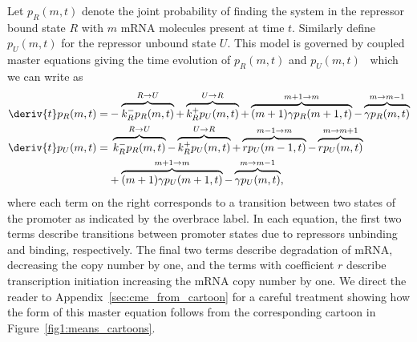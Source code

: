 Let $p_R(m,t)$ denote the joint probability of finding the system in the
repressor bound state $R$ with $m$ mRNA molecules present at time $t$. Similarly
define $p_U(m,t)$ for the repressor unbound state $U$. This model is governed
by coupled master equations giving the time evolution of $p_R(m,t)$ and
$p_U(m,t)$~\cite{Sanchez2008, Sanchez2011, Phillips2019} which we can write as
\begin{align}
\begin{split}
\deriv{t}p_R(m,t) =& 
- \overbrace{k_R^- p_R(m,t)}^{R \rightarrow U}
+ \overbrace{k_R^+ p_U(m,t)}^{U \rightarrow R}
+ \overbrace{(m+1)\gamma p_R(m+1,t)}^{m + 1 \rightarrow m}
- \overbrace{\gamma p_R(m,t)}^{m \rightarrow m - 1}
\\
\deriv{t}p_U(m,t) =&\; 
\overbrace{k_R^- p_R(m,t)}^{R \rightarrow U}
- \overbrace{k_R^+ p_U(m,t)}^{U \rightarrow R}
+ \overbrace{rp_U(m-1,t)}^{m-1 \rightarrow m}
- \overbrace{rp_U(m,t)}^{m \rightarrow m + 1}
\\
&+ \overbrace{(m+1)\gamma p_U(m+1,t)}^{m + 1 \rightarrow m}
- \overbrace{\gamma p_U(m,t)}^{m \rightarrow m - 1},
\label{eq:poisson_promoter_cme}
\end{split}
\end{align}
where each term on the right corresponds to a transition between two states of
the promoter as indicated by the overbrace label. In each equation, the first
two terms describe transitions between promoter states due to repressors
unbinding and binding, respectively. The final two terms describe degradation of
mRNA, decreasing the copy number by one, and the terms with coefficient $r$
describe transcription initiation increasing the mRNA copy number by one.
We direct the reader to Appendix~\ref{sec:cme_from_cartoon} for a careful
treatment showing how the form of this master equation follows from the
corresponding cartoon in Figure~\ref{fig1:means_cartoons}.

